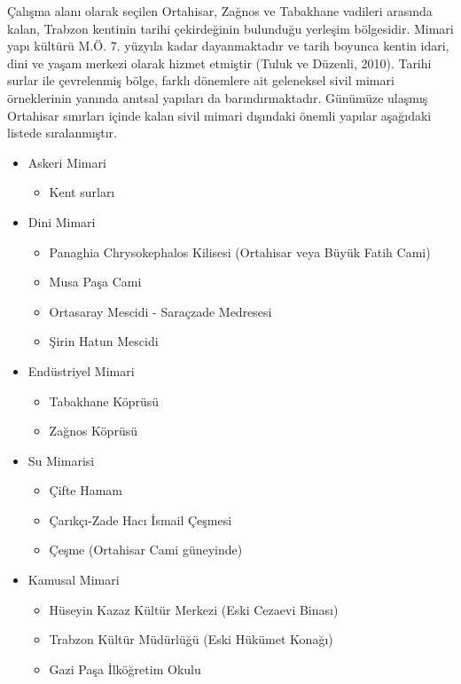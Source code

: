 \documentclass[12pt,turkish,a4paperpaper,]{report}
\providecommand{\tightlist}{%
  \setlength{\itemsep}{0pt}\setlength{\parskip}{0pt}}
\begin{document}
Çalışma alanı olarak seçilen Ortahisar, Zağnos ve Tabakhane vadileri
arasında kalan, Trabzon kentinin tarihi çekirdeğinin bulunduğu yerleşim
bölgesidir. Mimari yapı kültürü M.Ö. 7. yüzyıla kadar dayanmaktadır ve
tarih boyunca kentin idari, dini ve yaşam merkezi olarak hizmet etmiştir
(Tuluk ve Düzenli, 2010). Tarihi surlar ile çevrelenmiş bölge, farklı
dönemlere ait geleneksel sivil mimari örneklerinin yanında anıtsal
yapıları da barındırmaktadır. Günümüze ulaşmış Ortahisar sınırları
içinde kalan sivil mimari dışındaki önemli yapılar aşağıdaki listede
sıralanmıştır.

\begin{itemize}
\tightlist
\item
  Askeri Mimari

  \begin{itemize}
  \tightlist
  \item
    Kent surları
  \end{itemize}
\item
  Dini Mimari

  \begin{itemize}
  \tightlist
  \item
    Panaghia Chrysokephalos Kilisesi (Ortahisar veya Büyük Fatih Cami)
  \item
    Musa Paşa Cami
  \item
    Ortasaray Mescidi - Saraçzade Medresesi
  \item
    Şirin Hatun Mescidi
  \end{itemize}
\item
  Endüstriyel Mimari

  \begin{itemize}
  \tightlist
  \item
    Tabakhane Köprüsü
  \item
    Zağnos Köprüsü
  \end{itemize}
\item
  Su Mimarisi

  \begin{itemize}
  \tightlist
  \item
    Çifte Hamam
  \item
    Çarıkçı-Zade Hacı İsmail Çeşmesi
  \item
    Çeşme (Ortahisar Cami güneyinde)
  \end{itemize}
\item
  Kamusal Mimari

  \begin{itemize}
  \tightlist
  \item
    Hüseyin Kazaz Kültür Merkezi (Eski Cezaevi Binası)
  \item
    Trabzon Kültür Müdürlüğü (Eski Hükümet Konağı)
  \item
    Gazi Paşa İlköğretim Okulu
  \end{itemize}
\end{itemize}
\end{document}
